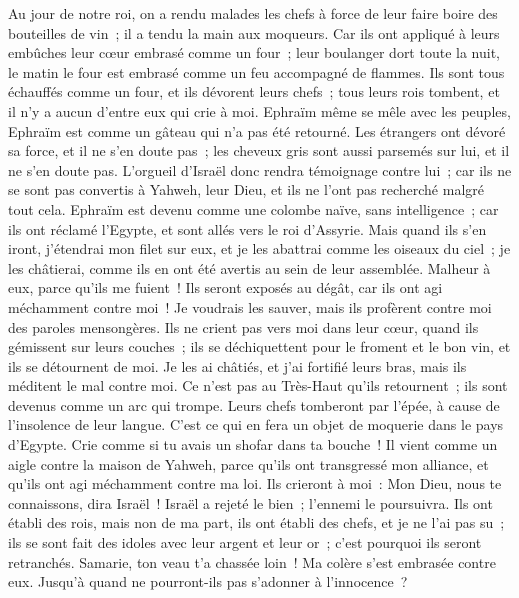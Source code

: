 \begin{multicols}{2}
Au jour de notre roi, on a rendu malades les chefs à force de leur faire boire des bouteilles de vin~; il a tendu la main aux moqueurs.
Car ils ont appliqué à leurs embûches leur cœur embrasé comme un four~; leur boulanger dort toute la nuit, le matin le four est embrasé comme un feu accompagné de flammes.
Ils sont tous échauffés comme un four, et ils dévorent leurs chefs~; tous leurs rois tombent, et il n'y a aucun d'entre eux qui crie à moi.
Ephraïm même se mêle avec les peuples, Ephraïm est comme un gâteau qui n'a pas été retourné.
Les étrangers ont dévoré sa force, et il ne s'en doute pas~; les cheveux gris sont aussi parsemés sur lui, et il ne s'en doute pas.
L'orgueil d'Israël donc rendra témoignage contre lui~; car ils ne se sont pas convertis à Yahweh, leur Dieu, et ils ne l'ont pas recherché malgré tout cela.
Ephraïm est devenu comme une colombe naïve, sans intelligence~; car ils ont réclamé l'Egypte, et sont allés vers le roi d'Assyrie.
Mais quand ils s'en iront, j'étendrai mon filet sur eux, et je les abattrai comme les oiseaux du ciel~; je les châtierai, comme ils en ont été avertis au sein de leur assemblée.
Malheur à eux, parce qu'ils me fuient~! Ils seront exposés au dégât, car ils ont agi méchamment contre moi~! Je voudrais les sauver, mais ils profèrent contre moi des paroles mensongères.
Ils ne crient pas vers moi dans leur cœur, quand ils gémissent sur leurs couches~; ils se déchiquettent pour le froment et le bon vin, et ils se détournent de moi.
Je les ai châtiés, et j'ai fortifié leurs bras, mais ils méditent le mal contre moi.
Ce n'est pas au Très-Haut qu'ils retournent~; ils sont devenus comme un arc qui trompe. Leurs chefs tomberont par l'épée, à cause de l'insolence de leur langue. C'est ce qui en fera un objet de moquerie dans le pays d'Egypte.
\VerseOne{}Crie comme si tu avais un shofar dans ta bouche~! Il vient comme un aigle contre la maison de Yahweh, parce qu'ils ont transgressé mon alliance, et qu'ils ont agi méchamment contre ma loi.
Ils crieront à moi~: Mon Dieu, nous te connaissons, dira Israël~!
Israël a rejeté le bien~; l'ennemi le poursuivra.
Ils ont établi des rois, mais non de ma part, ils ont établi des chefs, et je ne l'ai pas su~; ils se sont fait des idoles avec leur argent et leur or~; c'est pourquoi ils seront retranchés.
Samarie, ton veau t'a chassée loin~! Ma colère s'est embrasée contre eux. Jusqu'à quand ne pourront-ils pas s'adonner à l'innocence~?

\end{multicols}
